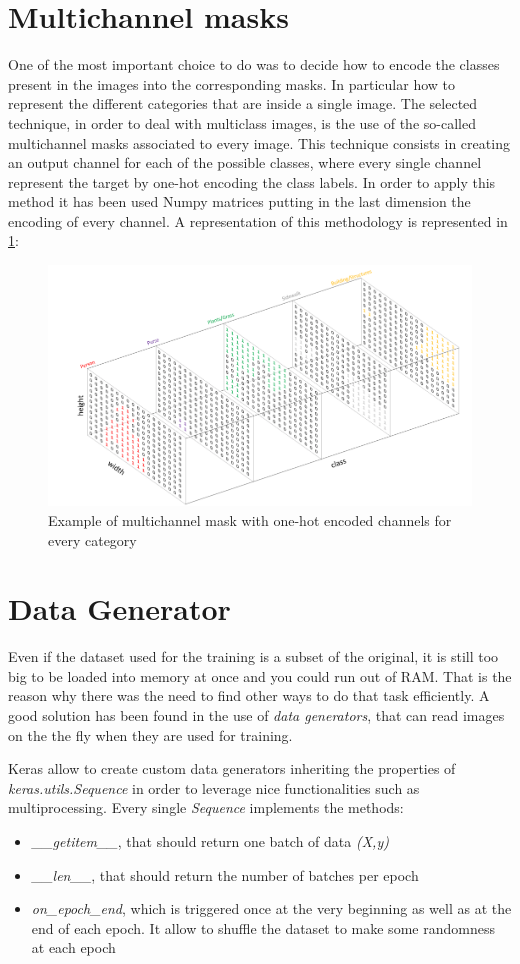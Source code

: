 \documentclass[a4paper,10pt]{report}
\begin{document}
\section{Multichannel masks}\label{sec:section-32}
One of the most important choice to do was to decide how to encode the classes present in the images into the corresponding masks. In particular how to represent the different categories that are inside a single image. The selected technique, in order to deal with multiclass images, is the use of the so-called multichannel masks associated to every image. This technique consists in creating an output channel for each of the possible classes, where every single channel represent the target by one-hot encoding the class labels. In order to apply this method it has been used Numpy matrices putting in the last dimension the encoding of every channel.
A representation of this methodology is represented in \ref{fig:{multimask}}:

\begin{figure}[h]
  \center
  \includegraphics[width=0.65\linewidth]{assets/img/multimask.png}
  \caption{Example of multichannel mask with one-hot encoded channels for every category}
  \label{fig:{multimask}}
\end{figure}


\section{Data Generator}\label{sec:section-33}
Even if the dataset used for the training is a subset of the original, it is still too big to be loaded into memory at once and you could run out of RAM.
That is the reason why there was the need to find other ways to do that task efficiently.
A good solution has been found in the use of \textit{data generators}, that can read images on the the fly when they are used for training.

Keras allow to create custom data generators inheriting the properties of \emph{keras.utils.Sequence} in order to leverage nice functionalities such as multiprocessing.
Every single \emph{Sequence} implements the methods:
\begin{itemize}
    \item \emph{__getitem__}, that should return one batch of data \emph{(X,y)}
    \item \emph{__len__}, that should return the number of batches per epoch
    \item \emph{on_epoch_end}, which is triggered once at the very beginning as well as at the end of each epoch. It allow to shuffle the dataset to make some randomness at each epoch
\end{itemize}
\end{document}

